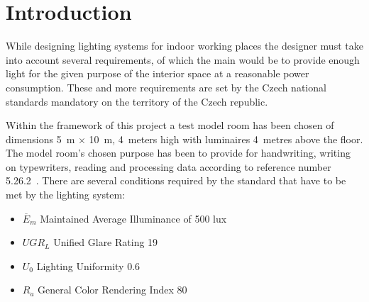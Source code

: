 \section{Introduction} \label{sec:intro}
While designing lighting systems for indoor working places the designer must take into account several requirements, of which the main would be to provide enough light for the given purpose of the interior space at a reasonable power consumption. These and more requirements are set by the Czech national standards \cite{12464} mandatory on the territory of the Czech republic.

Within the framework of this project a test model room has been chosen of dimensions 5~m $\times$ 10~m, 4~meters high with luminaires 4~metres above the floor. The model room's chosen purpose has been to provide for handwriting, writing on typewriters, reading and processing data according to reference number 5.26.2~\cite{12464}. There are several conditions required by the standard that have to be met by the lighting system:


\begin{itemize}
	\item $\overline{E}_{m}$ Maintained Average Illuminance of 500 lux
	\item $UGR_{L}$ Unified Glare Rating 19
	\item $U_{0}$ Lighting Uniformity 0.6
	\item $R_{a}$ General Color Rendering Index 80
\end{itemize}

